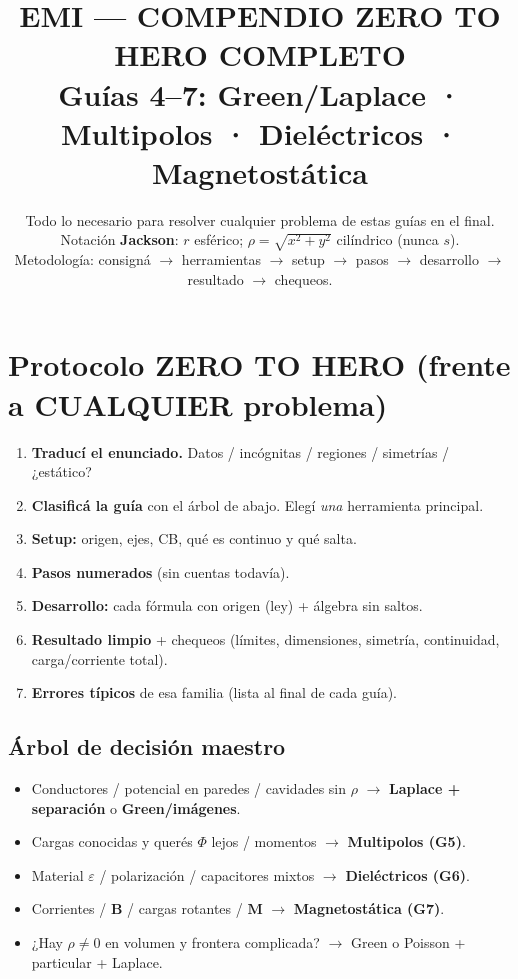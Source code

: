 \documentclass[10pt,a4paper]{article}
\title{\vspace{-0.9cm}\textbf{EMI --- COMPENDIO ZERO TO HERO COMPLETO}\\[1pt]
\large Guías 4--7: Green/Laplace · Multipolos · Dieléctricos · Magnetostática}
\author{Todo lo necesario para resolver cualquier problema de estas guías en el final.\\
Notación \textbf{Jackson}: \(r\) esférico; \(\rho=\sqrt{x^2+y^2}\) cilíndrico (nunca \(s\)).\\
Metodología: consigná $\to$ herramientas $\to$ setup $\to$ pasos $\to$ desarrollo $\to$ resultado $\to$ chequeos.}
\date{}
\newcommand{\vect}[1]{\mathbf{#1}}
\newcommand{\eps}{\varepsilon}
\begin{document}
\maketitle
\vspace{-1.1cm}

\section{Protocolo ZERO TO HERO (frente a CUALQUIER problema)}
\begin{enumerate}[label=\textbf{\arabic*.}]
\item \textbf{Traducí el enunciado.} Datos / incógnitas / regiones / simetrías / ¿estático?
\item \textbf{Clasificá la guía} con el árbol de abajo. Elegí \emph{una} herramienta principal.
\item \textbf{Setup:} origen, ejes, CB, qué es continuo y qué salta.
\item \textbf{Pasos numerados} (sin cuentas todavía).
\item \textbf{Desarrollo:} cada fórmula con origen (ley) + álgebra sin saltos.
\item \textbf{Resultado limpio} + chequeos (límites, dimensiones, simetría, continuidad, carga/corriente total).
\item \textbf{Errores típicos} de esa familia (lista al final de cada guía).
\end{enumerate}

\subsection{Árbol de decisión maestro}
\begin{itemize}
\item Conductores / potencial en paredes / cavidades sin $\rho$ $\to$ \textbf{Laplace + separación} o \textbf{Green/imágenes}.
\item Cargas conocidas y querés $\Phi$ lejos / momentos $\to$ \textbf{Multipolos (G5)}.
\item Material $\eps$ / polarización / capacitores mixtos $\to$ \textbf{Dieléctricos (G6)}.
\item Corrientes / $\vect{B}$ / cargas rotantes / $\vect{M}$ $\to$ \textbf{Magnetostática (G7)}.
\item ¿Hay $\rho\neq 0$ en volumen y frontera complicada? $\to$ Green o Poisson + particular + Laplace.
\end{itemize}

\end{document}
